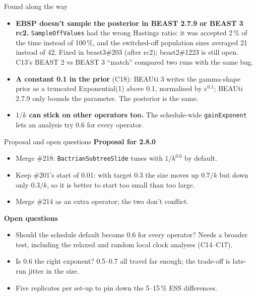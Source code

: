 \documentclass[aspectratio=169,11pt]{beamer}
\begin{document}
\begin{frame}{Found along the way}
  \begin{itemize}
    \item \textbf{EBSP doesn't sample the posterior in BEAST 2.7.9 or BEAST 3 rc2.}
      \texttt{SampleOffValues} had the wrong Hastings ratio: it was accepted 2\,\% of the time
      instead of 100\,\%, and the switched-off population sizes averaged 21 instead of 42.
      Fixed in beast3\#203 (after rc2); beast2\#1223 is still open. C13's BEAST 2 vs BEAST 3
      ``match'' compared two runs with the same bug.
    \item \textbf{A constant 0.1 in the prior} (C18): BEAUti 3 writes the gamma-shape prior as a
      truncated Exponential(1) above 0.1, normalised by $e^{0.1}$; BEAUti 2.7.9 only bounds the
      parameter. The posterior is the same.
    \item \textbf{$1/k$ can stick on other operators too.} The schedule-wide
      \texttt{gainExponent} lets an analysis try 0.6 for every operator.
  \end{itemize}
\end{frame}

\begin{frame}{Proposal and open questions}
  \textbf{Proposal for 2.8.0}
  \begin{itemize}
    \item Merge \#218: \texttt{BactrianSubtreeSlide} tunes with $1/k^{0.6}$ by default.
    \item Keep \#201's start of 0.01: with target 0.3 the size moves up $0.7/k$ but down only
      $0.3/k$, so it is better to start too small than too large.
    \item Merge \#214 as an extra operator; the two don't conflict.
  \end{itemize}
  \textbf{Open questions}
  \begin{itemize}
    \item Should the schedule default become 0.6 for every operator? Needs a broader test,
      including the relaxed and random local clock analyses (C14--C17).
    \item Is 0.6 the right exponent? 0.5--0.7 all travel far enough; the trade-off is late-run
      jitter in the size.
    \item Five replicates per set-up to pin down the 5--15\,\% ESS differences.
  \end{itemize}
\end{frame}
\end{document}
